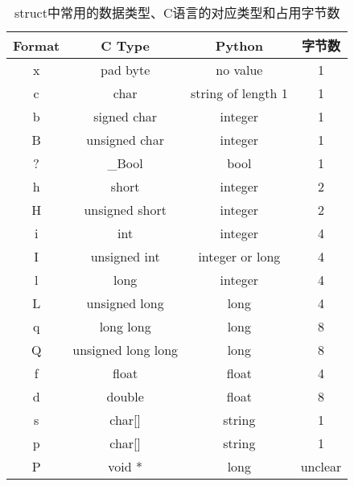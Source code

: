 \begin{table}[h]
 \centering
 \caption{struct中常用的数据类型、C语言的对应类型和占用字节数}
   \begin{tabular*}{1\textwidth}{@{\extracolsep{\fill}}cccc}
   \toprule
   Format       &C Type                &Python                      &字节数                   \\
   \midrule
   x            &pad byte              &no value                    &1         \\
   c            &char                  &string of length 1          &1         \\
   b            &signed char           &integer                     &1         \\
   B            &unsigned char         &integer                     &1         \\
   ?            &_Bool                 &bool                        &1         \\
   h            &short                 &integer                     &2         \\
   H            &unsigned short        &integer                     &2         \\
   i            &int                   &integer                     &4         \\
   I            &unsigned int          &integer or long             &4         \\
   l            &long                  &integer                     &4         \\
   L            &unsigned long         &long                        &4         \\
   q            &long long             &long                        &8         \\
   Q            &unsigned long long    &long                        &8         \\
   f            &float                 &float                       &4         \\
   d            &double                &float                       &8         \\
   s            &char[]                &string                      &1         \\
   p            &char[]                &string                      &1         \\
   P            &void *                &long                        &unclear   \\
   \bottomrule
   \end{tabular*}%
 \label{tab:bytes-list-of-data}%
\end{table}%

